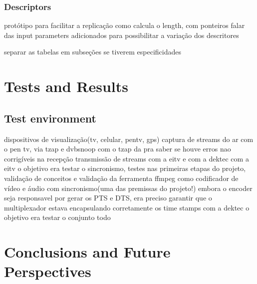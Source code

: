 \documentclass[
	12pt,				%
	openright,			%
	twoside,			%
	a4paper,			%
	brazil,
	french,				%
	english
	]{abntex2}
\begin{document}
\subsection{Descriptors}
protótipo para facilitar a replicação
como calcula o length, com ponteiros
falar das input parameters adicionados para possibilitar a variação dos descritores

separar as tabelas em subseções se tiverem especificidades


\chapter{Tests and Results}
%
\section{Test environment}
dispositivos de visualização(tv, celular, pentv, gps)
captura de streams do ar com o pen tv, via tzap e dvbsnoop
	com o tzap da pra saber se houve erros nao corrigíveis na recepção
transmissão de streams com a eitv e com a dektec
	com a eitv o objetivo era testar o sincronismo, testes nas primeiras etapas do projeto, validação de conceitos e validação da ferramenta ffmpeg como codificador de vídeo e áudio com sincronismo(uma das premissas do projeto!) embora o encoder seja responsavel por gerar os PTS e DTS, era preciso garantir que o multiplexador estava encapsulando corretamente os time stamps
	com a dektec o objetivo era testar o conjunto todo

%


\chapter*[Conclusions and Future Perspectives]{Conclusions and Future Perspectives}



\end{document}
